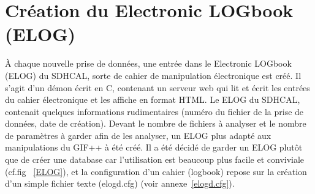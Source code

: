 \vspace*{-0.2cm}
\section{Création du Electronic LOGbook (ELOG)}
\vspace*{-0.4cm}
À chaque nouvelle prise de données, une entrée dans le Electronic LOGbook (ELOG) \cite{ELOG} du SDHCAL, sorte de cahier de manipulation électronique est créé. Il s'agit d'un démon écrit en C, contenant un serveur web qui lit et écrit les entrées du cahier électronique et les affiche en format HTML. Le ELOG du SDHCAL, contenait quelques informations rudimentaires (numéro du fichier de la prise de données, date de création). Devant le nombre de fichiers à analyser et le nombre de paramètres à garder afin de les analyser, un ELOG plus adapté aux manipulations du GIF++ à été créé. Il a été décidé de garder un ELOG plutôt que de créer une database car l'utilisation est beaucoup plus facile et conviviale (cf.fig~ \ref{ELOG}), et la configuration d'un cahier (logbook) repose sur la création d'un simple fichier texte (elogd.cfg) (voir annexe~\ref{elogd.cfg}). 

